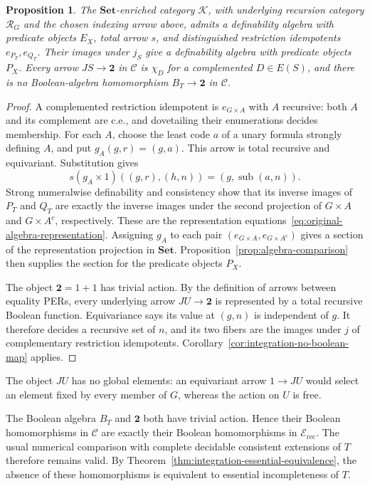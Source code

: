 \documentclass[11pt]{article}
\newtheorem{proposition}[theorem]{Proposition}
\theoremstyle{definition}
\theoremstyle{remark}
\begin{document}
\begin{proposition}\label{prop:equivariant-logical-model}
The $\mathbf{Set}$-enriched category $\mathcal K$, with underlying
recursion category $\mathcal R_G$ and the chosen indexing arrow above, admits a
definability algebra with predicate objects $E_X$, total arrow $s$,
and distinguished restriction idempotents $e_{P_T},e_{Q_T}$.
Their images under $j_S$
give a definability algebra with predicate objects $P_X$.
Every arrow $JS\to\mathbf2$ in $\mathcal C$ is $\chi_D$ for a
complemented $D\in E(S)$, and there is no Boolean-algebra
homomorphism $B_T\to\mathbf2$ in $\mathcal C$.
\end{proposition}
\begin{proof}
A complemented restriction idempotent is $e_{G\times A}$ with $A$ recursive:
both $A$ and its complement are c.e., and dovetailing their
enumerations decides membership. For each $A$, choose the least
code $a$ of a unary formula strongly defining $A$, and put
$g_A(g,r)=(g,a)$.
This arrow is total recursive and equivariant. Substitution
gives
\[
 s(g_A\times1)((g,r),(h,n))
       =(g,\operatorname{sub}(a,n)).
\]
Strong numeralwise definability and consistency show that
its inverse images of $P_T$ and $Q_T$ are exactly the inverse
images under the second projection of $G\times A$ and
$G\times A^c$, respectively. These are the representation
equations~\eqref{eq:original-algebra-representation}.
Assigning $g_A$ to each pair
$(e_{G\times A},e_{G\times A^c})$ gives
a section of the representation projection in $\mathbf{Set}$.
Proposition~\ref{prop:algebra-comparison} then supplies the
section for the predicate objects $P_X$.

The object $\mathbf2=1+1$ has trivial action.
By the definition of arrows between equality PERs, every underlying
arrow $JU\to\mathbf2$ is represented by a total recursive Boolean
function. Equivariance says its value at $(g,n)$ is independent
of $g$.  It therefore decides a recursive set of $n$, and its
two fibers are the images under $j$ of complementary restriction
idempotents.
Corollary~\ref{cor:integration-no-boolean-map} applies.
\end{proof}

The object $JU$ has no global elements: an equivariant arrow
$1\to JU$ would select an element fixed by every member of $G$,
whereas the action on $U$ is free.

The Boolean algebra $B_T$ and $\mathbf2$ both have trivial
action.  Hence their Boolean homomorphisms in $\mathcal C$ are
exactly their Boolean homomorphisms in
$\mathcal E_{\mathrm{rec}}$.  The usual numerical comparison
with complete decidable consistent extensions of $T$ therefore
remains valid. By Theorem~\ref{thm:integration-essential-equivalence},
the absence of these homomorphisms is equivalent to essential
incompleteness of $T$.
\end{document}
